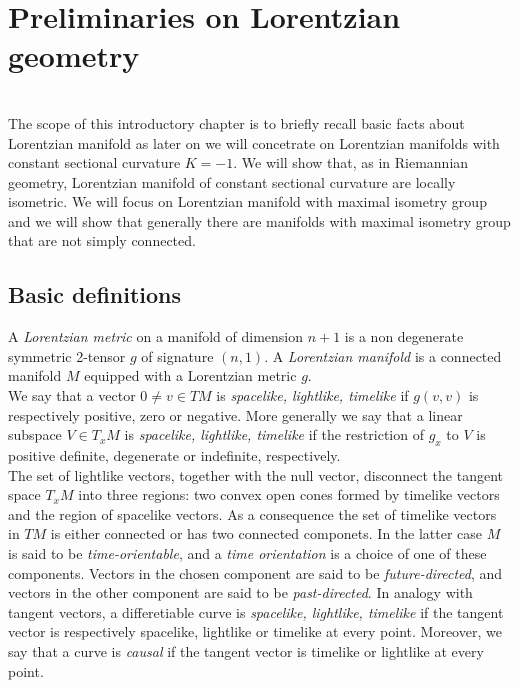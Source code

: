 \chapter{Preliminaries on Lorentzian geometry}

\\
The scope of this introductory chapter is to briefly recall basic facts about Lorentzian manifold as later on we will concetrate on Lorentzian manifolds with constant sectional curvature $K=-1$.
We will show that, as in Riemannian geometry, Lorentzian manifold of constant sectional curvature are locally isometric. We will focus on Lorentzian manifold with maximal isometry group and we will show that generally there are manifolds with maximal isometry group that are not simply connected.
\section{Basic definitions}
A \textit{Lorentzian metric} on a manifold of dimension $n+1$ is a non degenerate symmetric 2-tensor $g$ of signature $(n,1)$.
A \textit{Lorentzian manifold} is a connected manifold $M$ equipped with a Lorentzian metric $g$.\\
We say that a vector $0\neq v \in TM$ is \textit{spacelike, lightlike, timelike} if $g(v,v)$ is respectively positive, zero or negative.
More generally we say that a linear subspace $V \in T_x M$ is \textit{spacelike, lightlike, timelike} if the restriction of $g_x$ to $V$ is positive definite, degenerate or indefinite, respectively.\\
The set of lightlike vectors, together with the null vector, disconnect the tangent space $T_x M$ into three regions: two convex open cones formed by timelike vectors and the region of spacelike vectors.
As a consequence the set of timelike vectors in $TM$ is either connected or has two connected componets.
In the latter case $M$ is said to be \textit{time-orientable}, and a \textit{time orientation} is a choice of one of these components.
Vectors in the chosen component are said to be \textit{future-directed}, and vectors in the other component are said to be \textit{past-directed}.
In analogy with tangent vectors, a differetiable curve is \textit{spacelike, lightlike, timelike} if the tangent vector is respectively spacelike, lightlike or timelike at every point. Moreover, we say that a curve is \textit{causal} if the tangent vector is timelike or lightlike at every point.\\

